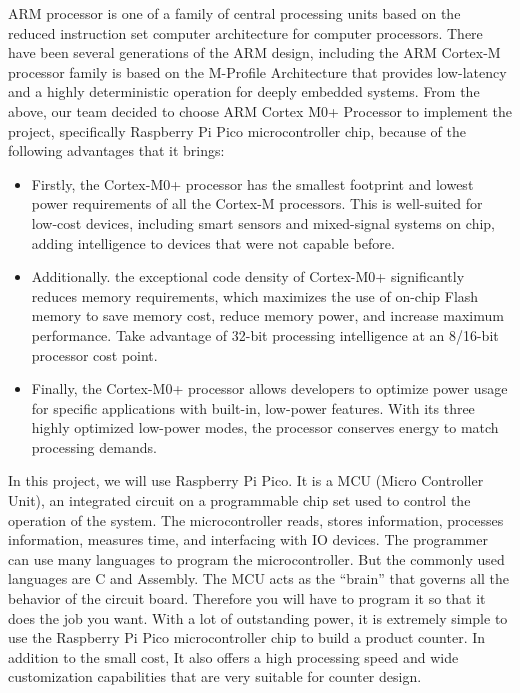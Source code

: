 \documentclass[13pt,a4paper,twoside]{report}
\begin{document}
ARM processor is one of a family of central processing units based on the reduced instruction set computer architecture for computer processors. There have been several generations of the ARM design, including the ARM Cortex-M processor family is based on the M-Profile Architecture that provides low-latency and a highly deterministic operation for deeply embedded systems. From the above, our team decided to choose ARM Cortex M0+ Processor to implement the project, specifically Raspberry Pi Pico microcontroller chip, because of the following advantages that it brings:
\begin{itemize}
\item Firstly, the Cortex-M0+ processor has the smallest footprint and lowest power requirements of all the Cortex-M processors. This is well-suited for low-cost devices, including smart sensors and mixed-signal systems on chip, adding intelligence to devices that were not capable before.

\item Additionally. the exceptional code density of Cortex-M0+ significantly reduces memory requirements, which maximizes the use of on-chip Flash memory to save memory cost, reduce memory power, and increase maximum performance. Take advantage of 32-bit processing intelligence at an 8/16-bit processor cost point.

\item Finally, the Cortex-M0+ processor allows developers to optimize power usage for specific applications with built-in, low-power features. With its three highly optimized low-power modes, the processor conserves energy to match processing demands.
\end{itemize}

In this project, we will use Raspberry Pi Pico. It is a MCU (Micro Controller Unit), an integrated circuit on a programmable chip set used to control the operation of the system. The microcontroller reads, stores information, processes information, measures time, and interfacing with IO devices. The programmer can use many languages to program the microcontroller. But the commonly used languages are C and Assembly. The MCU acts as the ``brain'' that governs all the behavior of the circuit board. Therefore you will have to program it so that it does the job you want. With a lot of outstanding power, it is extremely simple to use the Raspberry Pi Pico microcontroller chip to build a product counter. In addition to the small cost, It also offers a high processing speed and wide customization capabilities that are very suitable for counter design.
\end{document}
